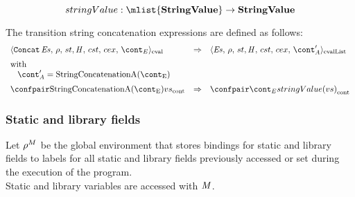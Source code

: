 \documentclass{article}
\begin{document}
\[stringValue : \mlist{\dstring} \rightarrow \dstring\]

\noindent
The transition string concatenation expressions are defined as follows:
\newcommand{\StringConcatenationA}{\mathrm{StringConcatenationA(\econt)}}
\[
  \begin{array}{lcl}
	\cesktrans{
		\evalconf{\StringConcatenation{\exprs}}{\env}{\strace}{\cstrace}{\cex}{\econt}}{
		\evallistconf{\exprs}{\env}{\strace}{\cstrace}{\cex}{\acont'}}\\[2mm]

	\textrm{with }\\
	\hspace{3mm}\acont' = \StringConcatenationA\\[2mm]
	\cesktrans{
		\contconf{\StringConcatenationA}{\vals}}{
		\contconf{\econt}{stringValue(\vals)}}
  \end{array}
\]


\subsubsection{Static and library fields}
\label{subsubsec:static-and-library-fields}
\newcommand{\ExitSK}[1]{\mathrm{ExitSK(\econt,\,#1)}}
\newcommand{\StaticGetK}{\mathrm{StaticGetK}(\membermeta,\,\econt)}

Let $\rho^{M}$ be the global environment that stores bindings for static and library fields to labels for all static and library fields previously accessed or set during the execution of the program.\\
Static and library variables are accessed with $\mathit{M}$. 
\end{document}
